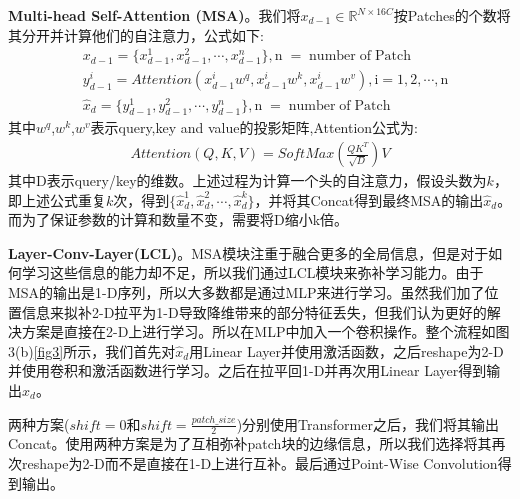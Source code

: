 \textbf{Multi-head Self-Attention (MSA)}。我们将$x_{d-1} \in \mathbb{R}^{N \times 16C}$按Patches的个数将其分开并计算他们的自注意力，公式如下:
\begin{equation}
\begin{aligned}
&x_{d-1} = \{x^1_{d-1},x^2_{d-1},\cdots,x^n_{d-1}\}, \mathrm{n\;=\;number\;of\;Patch} \\
&y^i_{d-1} = Attention(x^i_{d-1}w^q,x^i_{d-1}w^k,x^i_{d-1}w^v), \mathrm{i=1,2,\cdots,n} \\
&\hat{x}_{d} = \{y^1_{d-1},y^2_{d-1},\cdots,y^n_{d-1}\},\mathrm{n\;=\;number\;of\;Patch} 
\end{aligned}
\end{equation}
其中$w^q$,$w^k$,$w^v$表示query,key and value的投影矩阵,Attention公式为:
\begin{equation}
\begin{aligned}
Attention(Q,K,V) = SoftMax(\frac{QK^T}{\sqrt{D}})V
\end{aligned}\end{equation}
其中D表示query/key的维数。上述过程为计算一个头的自注意力，假设头数为$k$，即上述公式重复$k$次，得到$\{\hat{x}^1_{d},\hat{x}^2_{d},\cdots,\hat{x}^k_{d}\}$，并将其Concat得到最终MSA的输出$\hat{x}_{d}$。而为了保证参数的计算和数量不变，需要将D缩小k倍。\par
\textbf{Layer-Conv-Layer(LCL)}。MSA模块注重于融合更多的全局信息，但是对于如何学习这些信息的能力却不足，所以我们通过LCL模块来弥补学习能力。由于MSA的输出是1-D序列，所以大多数都是通过MLP来进行学习。虽然我们加了位置信息来拟补2-D拉平为1-D导致降维带来的部分特征丢失，但我们认为更好的解决方案是直接在2-D上进行学习。所以在MLP中加入一个卷积操作。整个流程如图3(b)\ref{fig3}所示，我们首先对$\hat{x}_{d}$用Linear Layer并使用激活函数，之后reshape为2-D并使用卷积和激活函数进行学习。之后在拉平回1-D并再次用Linear Layer得到输出$x_d$。\par

两种方案($shift=0$和$shift=\frac{patch\_size}{2}$)分别使用Transformer之后，我们将其输出Concat。使用两种方案是为了互相弥补patch块的边缘信息，所以我们选择将其再次reshape为2-D而不是直接在1-D上进行互补。最后通过Point-Wise Convolution\cite{2017Xception}得到输出。\par

